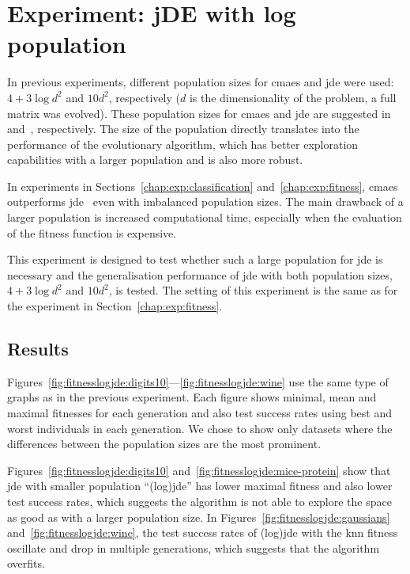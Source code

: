 \documentclass[12pt,a4paper]{report}
\begin{document}
\section{Experiment: jDE with log population} \label{chap:exp:logjde}
In previous experiments, different population sizes for \ac{cmaes} and \ac{jde} were used: $4+3\log{d^2}$ and $10d^2$, respectively ($d$ is the dimensionality of the problem, a full matrix was evolved). These population sizes for \ac{cmaes} and \ac{jde} are suggested in~\citep{hansen2001completely} and~\citep{brest2006self}, respectively. The size of the population directly translates into the performance of the evolutionary algorithm, which has better exploration capabilities with a larger population and is also more robust.

In experiments in Sections~\ref{chap:exp:classification} and~\ref{chap:exp:fitness}, \ac{cmaes} outperforms \ac{jde}~\citep{fukui2013evolutionary} even with imbalanced population sizes. The main drawback of a larger population is increased computational time, especially when the evaluation of the fitness function is expensive.

This experiment is designed to test whether such a large population for \ac{jde} is necessary and the generalisation performance of \ac{jde} with both population sizes, $4+3\log{d^2}$ and $10d^2$, is tested. The setting of this experiment is the same as for the experiment in Section~\ref{chap:exp:fitness}.

\subsection{Results}

Figures~\ref{fig:fitnesslogjde:digits10}---\ref{fig:fitnesslogjde:wine} use the same type of graphs as in the previous experiment. Each figure shows minimal, mean and maximal fitnesses for each generation and also test success rates using best and worst individuals in each generation. We chose to show only datasets where the differences between the population sizes are the most prominent.

Figures~\ref{fig:fitnesslogjde:digits10} and~\ref{fig:fitnesslogjde:mice-protein} show that \ac{jde} with smaller population ``(log)\ac{jde}'' has lower maximal fitness and also lower test success rates, which suggests the algorithm is not able to explore the space as good as with a larger population size. In Figures~\ref{fig:fitnesslogjde:gaussians} and~\ref{fig:fitnesslogjde:wine}, the test success rates of (log)\ac{jde} with the \ac{knn} fitness oscillate and drop in multiple generations, which suggests that the algorithm overfits.
\end{document}
